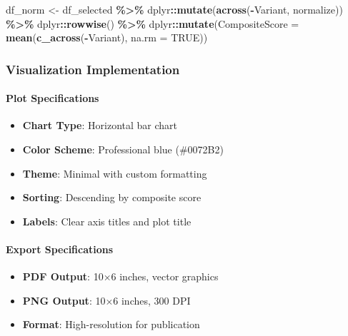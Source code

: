 \documentclass[
  11pt,
]{article}
\newenvironment{Shaded}{\begin{snugshade}}{\end{snugshade}}
\newcommand{\AttributeTok}[1]{\textcolor[rgb]{0.13,0.29,0.53}{#1}}
\newcommand{\ConstantTok}[1]{\textcolor[rgb]{0.56,0.35,0.01}{#1}}
\newcommand{\FunctionTok}[1]{\textcolor[rgb]{0.13,0.29,0.53}{\textbf{#1}}}
\newcommand{\NormalTok}[1]{#1}
\newcommand{\OtherTok}[1]{\textcolor[rgb]{0.56,0.35,0.01}{#1}}
\newcommand{\SpecialCharTok}[1]{\textcolor[rgb]{0.81,0.36,0.00}{\textbf{#1}}}
\providecommand{\tightlist}{%
  \setlength{\itemsep}{0pt}\setlength{\parskip}{0pt}}
\begin{document}
\begin{enumerate}
\begin{Shaded}
\begin{Highlighting}[]
\NormalTok{df\_norm }\OtherTok{\textless{}{-}}\NormalTok{ df\_selected }\SpecialCharTok{\%\textgreater{}\%}
\NormalTok{  dplyr}\SpecialCharTok{::}\FunctionTok{mutate}\NormalTok{(}\FunctionTok{across}\NormalTok{(}\SpecialCharTok{{-}}\NormalTok{Variant, normalize)) }\SpecialCharTok{\%\textgreater{}\%}
\NormalTok{  dplyr}\SpecialCharTok{::}\FunctionTok{rowwise}\NormalTok{() }\SpecialCharTok{\%\textgreater{}\%}
\NormalTok{  dplyr}\SpecialCharTok{::}\FunctionTok{mutate}\NormalTok{(}\AttributeTok{CompositeScore =} \FunctionTok{mean}\NormalTok{(}\FunctionTok{c\_across}\NormalTok{(}\SpecialCharTok{{-}}\NormalTok{Variant), }\AttributeTok{na.rm =} \ConstantTok{TRUE}\NormalTok{))}
\end{Highlighting}
\end{Shaded}
\end{enumerate}

\subsubsection{Visualization
Implementation}\label{visualization-implementation}

\paragraph{Plot Specifications}\label{plot-specifications}

\begin{itemize}
\tightlist
\item
  \textbf{Chart Type}: Horizontal bar chart
\item
  \textbf{Color Scheme}: Professional blue (\#0072B2)
\item
  \textbf{Theme}: Minimal with custom formatting
\item
  \textbf{Sorting}: Descending by composite score
\item
  \textbf{Labels}: Clear axis titles and plot title
\end{itemize}

\paragraph{Export Specifications}\label{export-specifications}

\begin{itemize}
\tightlist
\item
  \textbf{PDF Output}: 10×6 inches, vector graphics
\item
  \textbf{PNG Output}: 10×6 inches, 300 DPI
\item
  \textbf{Format}: High-resolution for publication
\end{itemize}
\end{document}
